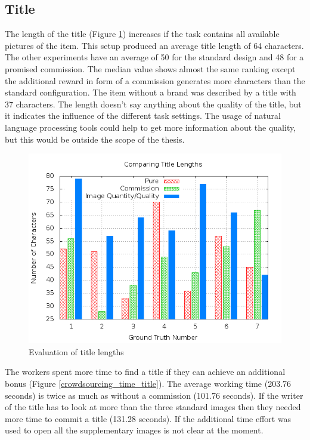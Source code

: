 \subsection{Title}
The length of the title (Figure \ref{crowdsourcing_title_length}) increases if the task contains all available pictures of the item. This setup produced an average title length of 64 characters. The other experiments have an average of 50 for the standard design and 48 for a promised commission. The median value shows almost the same ranking except the additional reward in form of a commission generates more characters than the standard configuration. The item without a brand was described by a title with 37 characters. The length doesn't say anything about the quality of the title, but it indicates the influence of the different task settings. The usage of natural language processing tools could help to get more information about the quality, but this would be outside the scope of the thesis.
\begin{figure}
\centering
\includegraphics[scale=0.55]{images/plots/crowdsourcing/plot_title_length.png}
\caption{Evaluation of title lengths}
\label{crowdsourcing_title_length}
\end{figure}
The workers spent more time to find a title if they can achieve an additional bonus (Figure \ref{crowdsourcing_time_title}). The average working time (203.76 seconds) is twice as much as without a commission (101.76 seconds). If the writer of the title has to look at more than the three standard images then they needed more time to commit a title (131.28 seconds). If the additional time effort was used to open all the supplementary images is not clear at the moment.

